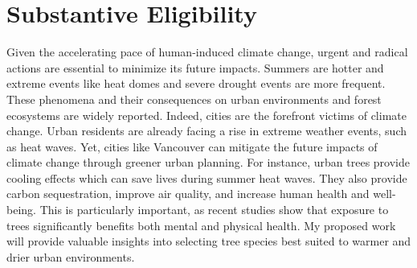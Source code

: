 \documentclass[11pt,letter]{article}
\begin{document}
\section *{Substantive Eligibility} 
Given the accelerating pace of human-induced climate change, urgent and radical actions are essential to minimize its future impacts. Summers are hotter and extreme events like heat domes and severe drought events are more frequent. \citep{zhang_increased_2023} These phenomena and their consequences on urban environments and forest ecosystems are widely reported. \citep{allen_global_2010} Indeed, cities are the forefront victims of climate change. \citep{das_unraveling_2024} Urban residents are already facing a rise in extreme weather events, such as heat waves.\citep{das_unraveling_2024} Yet, cities like Vancouver can mitigate the future impacts of climate change through greener urban planning. For instance, urban trees provide cooling effects which can save lives during summer heat waves. \citep{ettinger_street_2024} They also provide carbon sequestration, improve air quality, and increase human health and well-being. \citep{wolf_urban_2020} This is particularly important, as recent studies show that exposure to trees significantly benefits both mental and physical health.  \citep{wolf_urban_2020} My proposed work will provide valuable insights into selecting tree species best suited to warmer and drier urban environments. %
\end{document}
